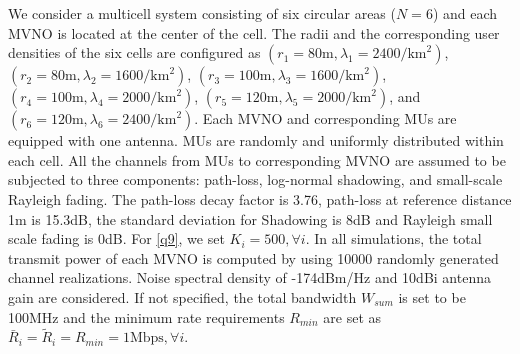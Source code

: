 \documentclass[journal]{IEEEtran}
\begin{document}
We consider a multicell system consisting of six circular areas ($N = 6$) and each MVNO is located at the center of the cell. The radii and the corresponding user densities of the six cells are configured as $(r_1 = 80\mbox{m}, \lambda_1 = 2400/\mbox{km}^2)$, $(r_2 = 80\mbox{m}, \lambda_2 = 1600/\mbox{km}^2)$, $(r_3 = 100\mbox{m}, \lambda_3 = 1600/\mbox{km}^2)$, $(r_4 = 100\mbox{m}, \lambda_4 = 2000/\mbox{km}^2)$, $(r_5 = 120\mbox{m}, \lambda_5 = 2000/\mbox{km}^2)$, and $(r_6 = 120\mbox{m}, \lambda_6 = 2400/\mbox{km}^2)$. Each MVNO and corresponding MUs are equipped with one antenna. MUs are randomly and uniformly distributed within each cell. All the channels from MUs to corresponding MVNO are assumed to be subjected to three components: path-loss, log-normal shadowing, and small-scale Rayleigh fading. The path-loss decay factor is 3.76, 
path-loss at reference distance 1m is 15.3dB, the standard deviation for Shadowing is 8dB and Rayleigh small scale fading is 0dB. For \eqref{q9}, we set $K_i = 500, \forall i$. In all simulations, the total transmit power of each MVNO is computed by using 10000 randomly generated channel realizations. Noise spectral density of -174dBm/Hz and 10dBi antenna gain are considered. If not specified, the total bandwidth $W_{sum}$ is set to be 100MHz and the minimum rate requirements $R_{min}$ are set as $\bar{R}_i = \tilde{R}_i = R_{min} = 1\mbox{Mbps}, \forall i$.
\end{document}
